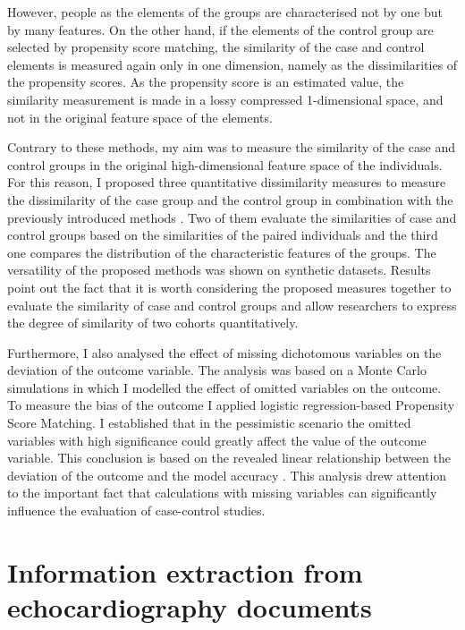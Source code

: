 However, people as the elements of the groups are characterised not by one but by many features. On the other hand, if the elements of the control group are selected by propensity score matching, the similarity of the case and control elements is measured again only in one dimension, namely as the dissimilarities of the propensity scores. As the propensity score is an estimated value, the similarity measurement is made in a lossy compressed 1-dimensional space, and not in the original feature space of the elements.

Contrary to these methods, my aim was to measure the similarity of the case and control groups in the original high-dimensional feature space of the individuals. For this reason, I proposed three quantitative dissimilarity measures to measure the dissimilarity of the case group and the control group in combination with the previously introduced methods \cite{szeker2018measuring, szeker2019can}. Two of them evaluate the similarities of case and control groups based on the similarities of the paired individuals and the third one compares the distribution of the characteristic features of the groups. The versatility of the proposed methods was shown on synthetic datasets. Results point out the fact that it is worth considering the proposed measures together to evaluate the similarity of case and control groups and allow researchers to express the degree of similarity of two cohorts quantitatively.

Furthermore, I also analysed the effect of missing dichotomous variables on the deviation of the outcome variable. The analysis was based on a Monte Carlo simulations in which I modelled the effect of omitted variables on the outcome. To measure the bias of the outcome I applied logistic regression-based Propensity Score Matching. I established that in the pessimistic scenario the omitted variables with high significance could greatly affect the value of the outcome variable. This conclusion is based on the revealed linear relationship between the deviation of the outcome and the model accuracy \cite{szeker2018effect}. This analysis drew attention to the important fact that calculations with missing variables can significantly influence the evaluation of case-control studies.

\section{Information extraction from echocardiography documents}
\label{sec:tm_intro}

